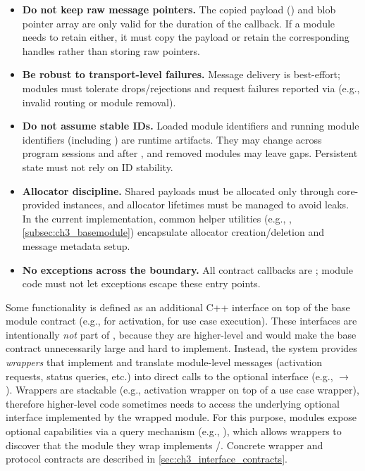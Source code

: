\begin{itemize}
    \item \textbf{Do not keep raw message pointers.} The copied payload () and blob pointer array are only valid for the duration of the callback. If a module needs to retain either, it must copy the payload or retain the corresponding  handles rather than storing raw pointers.
    \item \textbf{Be robust to transport-level failures.} Message delivery is best-effort; modules must tolerate drops/rejections and request failures reported via  (e.g., invalid routing or module removal).
    \item \textbf{Do not assume stable IDs.} Loaded module identifiers and running module identifiers (including ) are runtime artifacts. They may change across program sessions and after , and removed modules may leave gaps. Persistent state must not rely on ID stability.
    \item \textbf{Allocator discipline.} Shared payloads must be allocated only through core-provided  instances, and allocator lifetimes must be managed to avoid leaks. In the current implementation, common helper utilities (e.g., , \autoref{subsec:ch3_basemodule}) encapsulate allocator creation/deletion and message metadata setup.
    \item \textbf{No exceptions across the boundary.} All contract callbacks are ; module code must not let exceptions escape these entry points.
\end{itemize}

Some functionality is defined as an additional C++ interface on top of the base module contract (e.g.,  for activation,  for use case execution). These interfaces are intentionally \emph{not} part of , because they are higher-level and would make the base contract unnecessarily large and hard to implement. Instead, the system provides \emph{wrappers} that implement  and translate module-level messages (activation requests, status queries, etc.) into direct calls to the optional interface (e.g.,  $\rightarrow$ ). Wrappers are stackable (e.g., activation wrapper on top of a use case wrapper), therefore higher-level code sometimes needs to access the underlying optional interface implemented by the wrapped module. For this purpose, modules expose optional capabilities via a query mechanism (e.g., ), which allows wrappers to discover that the module they wrap implements /. Concrete wrapper and protocol contracts are described in \autoref{sec:ch3_interface_contracts}.

